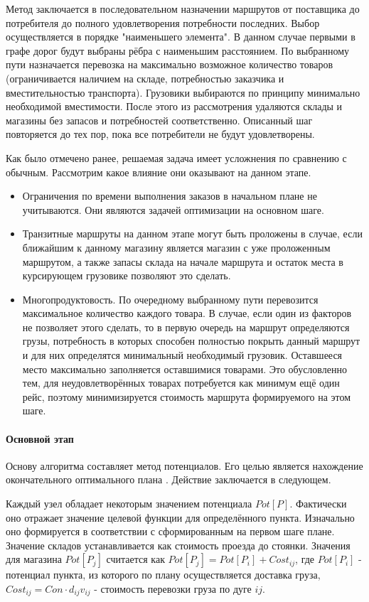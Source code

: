 	Метод заключается в последовательном назначении маршрутов от поставщика до потребителя до полного удовлетворения потребности последних. Выбор осуществляется в порядке "наименьшего элемента". В данном случае первыми в графе дорог будут выбраны рёбра с наименьшим расстоянием. По выбранному пути назначается перевозка на максимально возможное количество товаров (ограничивается наличием на складе, потребностью заказчика и вместительностью транспорта). Грузовики выбираются по принципу минимально необходимой вместимости. После этого из рассмотрения удаляются склады и магазины без запасов и потребностей соответственно. Описанный шаг повторяется до тех пор, пока все потребители не будут удовлетворены.
	
	Как было отмечено ранее, решаемая задача имеет усложнения по сравнению с обычным. Рассмотрим какое влияние они оказывают на данном этапе.
	\begin{itemize}
		\item Ограничения по времени выполнения заказов в начальном плане не учитываются. Они являются задачей оптимизации на основном шаге.
		\item Транзитные маршруты на данном этапе могут быть проложены в случае, если ближайшим к данному магазину является магазин с уже проложенным маршрутом, а также запасы склада на начале маршрута и остаток места в курсирующем грузовике позволяют это сделать.
		\item Многопродуктовость\cite{trans:polyprod}. По очередному выбранному пути перевозится максимальное количество каждого товара. В случае, если один из факторов не позволяет этого сделать, то в первую очередь на маршрут определяются грузы, потребность в которых способен полностью покрыть данный маршрут и для них определятся минимальный необходимый грузовик. Оставшееся место максимально заполняется  оставшимися товарами. Это обусловленно тем, для неудовлетворённых товарах потребуется как минимум ещё один рейс, поэтому минимизируется стоимость маршрута формируемого на этом шаге.
	\end{itemize}
	
	
	\paragraph{Основной этап}
	Основу алгоритма составляет метод потенциалов. Его целью является нахождение окончательного оптимального плана \cite{potential}. Действие заключается в следующем. 
	
	Каждый узел обладает некоторым значением потенциала $Pot[P]$. Фактически оно отражает значение целевой функции для определённого пункта. Изначально оно формируется в соответствии с сформированным на первом шаге плане. Значение складов устанавливается как стоимость проезда до стоянки. Значения для магазина $Pot[P_j]$ считается как $Pot[P_j] = Pot[P_i] + Cost_{ij}$, где $Pot[P_i]$ - потенциал пункта, из которого по плану осуществляется доставка груза, $Cost_{ij} = Con \cdot d_{ij} v_{ij}$ - стоимость перевозки груза по дуге $ij$.
	
